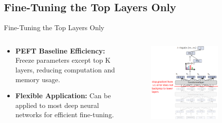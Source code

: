 \documentclass[serif, aspectratio=169]{beamer}
\begin{document}
\subsection{Fine-Tuning the Top Layers Only}
\begin{frame}{Fine-Tuning the Top Layers Only}
    \begin{columns} %

        \begin{column}{0.5\textwidth}
            \begin{itemize}
                \item  
                    \textbf{PEFT Baseline Efficiency:}
                     Freeze parameters except top K layers, reducing computation and memory usage.
                    \vspace{0.3cm}
                \item  
                    \textbf{Flexible Application:}
                      Can be applied to most deep neural networks for efficient fine-tuning.
                    \vspace{0.3cm}
            \end{itemize}
        \end{column}

        \begin{column}{0.5\textwidth}
            \begin{figure}
                \centering
                \includegraphics[width=0.85\textwidth]{pic/last layer.PNG}
            \end{figure}
        \end{column}

    \end{columns}
\end{frame}
\end{document}
